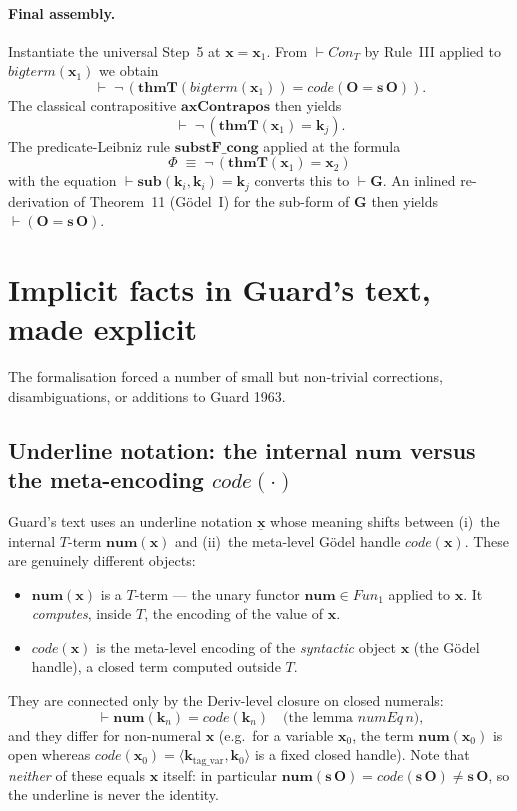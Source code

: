 \documentclass[11pt]{article}
\theoremstyle{plain}
\theoremstyle{definition}
\theoremstyle{remark}
\newcommand{\code}[1]{\mathit{code}(#1)}
\newcommand{\sub}{\mathbf{sub}}
\newcommand{\thmT}{\mathbf{thmT}}
\newcommand{\num}{\mathbf{num}}
\newcommand{\seq}[1]{\langle #1 \rangle}
\newcommand{\Fun}{\mathit{Fun}}
\newcommand{\Con}{\mathit{Con}}
\begin{document}
\paragraph{Final assembly.}  Instantiate the universal Step~5 at
$\mathbf{x} = \mathbf{x}_1$.  From $\vdash \Con_T$ by Rule~III applied
to $\mathit{bigterm}(\mathbf{x}_1)$ we obtain
\[
\vdash \;\neg\,(\thmT(\mathit{bigterm}(\mathbf{x}_1)) = \code{\mathbf{O} = \mathbf{s}\,\mathbf{O}}).
\]
The classical contrapositive $\mathbf{axContrapos}$ then yields
\[
\vdash \;\neg\,(\thmT(\mathbf{x}_1) = \mathbf{k}_j).
\]
The predicate-Leibniz rule $\mathbf{substF\_cong}$ applied at the
formula
\[
\Phi \;\equiv\; \neg\,(\thmT(\mathbf{x}_1) = \mathbf{x}_2)
\]
with the equation $\vdash \sub(\mathbf{k}_i, \mathbf{k}_i) = \mathbf{k}_j$
converts this to $\vdash \mathbf{G}$.  An inlined re-derivation of
Theorem~11 (G\"odel~I) for the sub-form of $\mathbf{G}$ then yields
$\vdash (\mathbf{O} = \mathbf{s}\,\mathbf{O})$.

\section{Implicit facts in Guard's text, made explicit}

The formalisation forced a number of small but non-trivial corrections,
disambiguations, or additions to Guard 1963.

\subsection{Underline notation: the internal $\num$ versus the meta-encoding $\code{\cdot}$}

Guard's text uses an underline notation $\underline{\mathbf{x}}$ whose
meaning shifts between (i)~the internal $T$-term $\num(\mathbf{x})$
and (ii)~the meta-level G\"odel handle $\code{\mathbf{x}}$.  These are
genuinely different objects:
\begin{itemize}
\item $\num(\mathbf{x})$ is a $T$-term --- the unary functor $\num \in
\Fun_1$ applied to $\mathbf{x}$.  It \emph{computes}, inside $T$, the
encoding of the value of $\mathbf{x}$.
\item $\code{\mathbf{x}}$ is the meta-level encoding of the
\emph{syntactic} object $\mathbf{x}$ (the G\"odel handle), a closed
term computed outside $T$.
\end{itemize}
They are connected only by the Deriv-level closure on closed numerals:
\[
\vdash \num(\mathbf{k}_n) = \code{\mathbf{k}_n}
\quad\text{(the lemma $\mathit{numEq}\,n$),}
\]
and they differ for non-numeral $\mathbf{x}$ (e.g.\ for a variable
$\mathbf{x}_0$, the term $\num(\mathbf{x}_0)$ is open whereas
$\code{\mathbf{x}_0} = \seq{\mathbf{k}_{\mathrm{tag\_var}}, \mathbf{k}_0}$
is a fixed closed handle).  Note that \emph{neither} of these equals
$\mathbf{x}$ itself: in particular $\num(\mathbf{s}\,\mathbf{O}) =
\code{\mathbf{s}\,\mathbf{O}} \neq \mathbf{s}\,\mathbf{O}$, so the
underline is never the identity.
\end{document}
